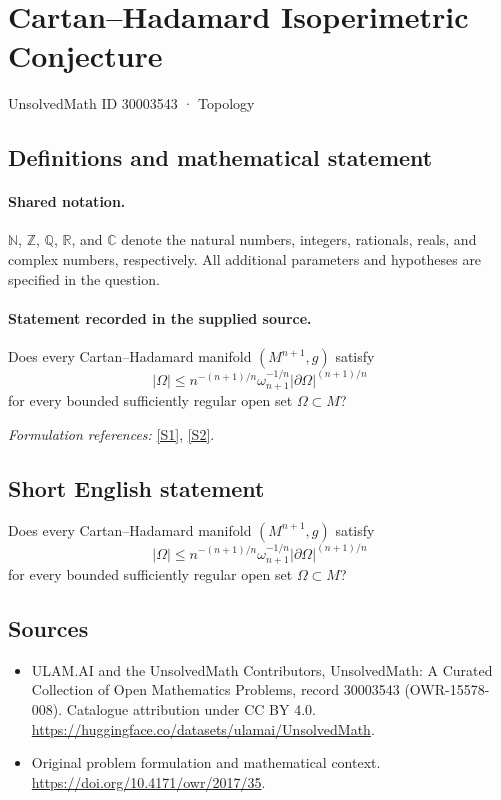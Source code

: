 \documentclass[11pt]{article}
\newcommand{\sref}[2]{\hyperlink{source:#1:#2}{[S#2]}}
\begin{document}
\setcounter{section}{30003542}
\section{Cartan–Hadamard Isoperimetric Conjecture}\label{30003543}
{\small UnsolvedMath ID 30003543 · Topology}
\subsection{Definitions and mathematical statement}

\paragraph{Shared notation.}$\mathbb N$, $\mathbb Z$, $\mathbb Q$, $\mathbb R$, and $\mathbb C$ denote the natural numbers, integers, rationals, reals, and complex numbers, respectively. All additional parameters and hypotheses are specified in the question.


\paragraph{Statement recorded in the supplied source.}
Does every Cartan–Hadamard manifold $(M^{n+1},g)$ satisfy
$$
|\Omega|\leq n^{-(n+1)/n}\omega_{n+1}^{-1/n}|\partial\Omega|^{(n+1)/n}
$$
for every bounded sufficiently regular open set $\Omega\subset M$?
\par\smallskip\textit{Formulation references:} \sref{30003543}{1}, \sref{30003543}{2}.
\subsection{Short English statement}
Does every Cartan–Hadamard manifold $(M^{n+1},g)$ satisfy
$$
|\Omega|\leq n^{-(n+1)/n}\omega_{n+1}^{-1/n}|\partial\Omega|^{(n+1)/n}
$$
for every bounded sufficiently regular open set $\Omega\subset M$?
\subsection{Sources}
\begin{itemize}
\item[\hypertarget{source:30003543:1}{S1}] ULAM.AI and the UnsolvedMath Contributors, UnsolvedMath: A Curated Collection of Open Mathematics Problems, record 30003543 (OWR-15578-008). Catalogue attribution under CC BY 4.0.
\url{https://huggingface.co/datasets/ulamai/UnsolvedMath}.
\item[\hypertarget{source:30003543:2}{S2}] Original problem formulation and mathematical context.
\url{https://doi.org/10.4171/owr/2017/35}.
\end{itemize}
\label{end:30003543}
\end{document}
